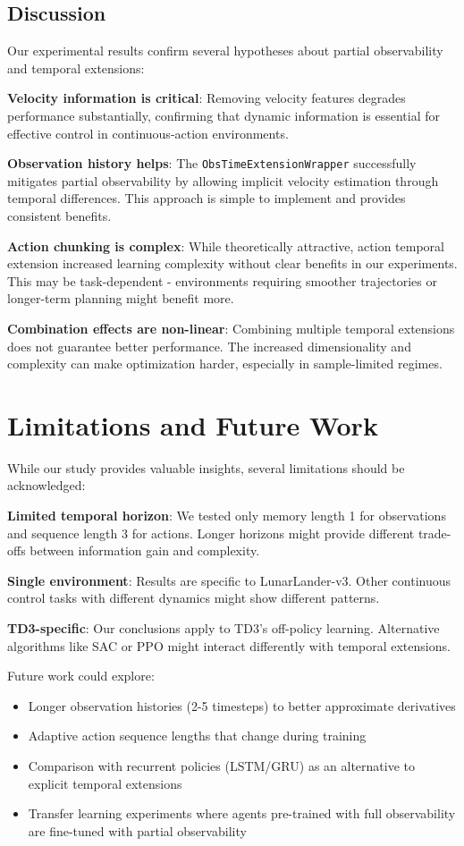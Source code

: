 \documentclass[12pt, a4paper]{article}
\begin{document}
\subsection{Discussion}

Our experimental results confirm several hypotheses about partial observability and temporal extensions:

\textbf{Velocity information is critical}: Removing velocity features degrades performance substantially, confirming that dynamic information is essential for effective control in continuous-action environments.

\textbf{Observation history helps}: The \texttt{ObsTimeExtensionWrapper} successfully mitigates partial observability by allowing implicit velocity estimation through temporal differences. This approach is simple to implement and provides consistent benefits.

\textbf{Action chunking is complex}: While theoretically attractive, action temporal extension increased learning complexity without clear benefits in our experiments. This may be task-dependent - environments requiring smoother trajectories or longer-term planning might benefit more.

\textbf{Combination effects are non-linear}: Combining multiple temporal extensions does not guarantee better performance. The increased dimensionality and complexity can make optimization harder, especially in sample-limited regimes.

\section{Limitations and Future Work}

While our study provides valuable insights, several limitations should be acknowledged:

\textbf{Limited temporal horizon}: We tested only memory length 1 for observations and sequence length 3 for actions. Longer horizons might provide different trade-offs between information gain and complexity.

\textbf{Single environment}: Results are specific to LunarLander-v3. Other continuous control tasks with different dynamics might show different patterns.

\textbf{TD3-specific}: Our conclusions apply to TD3's off-policy learning. Alternative algorithms like SAC or PPO might interact differently with temporal extensions.

Future work could explore:
\begin{itemize}
	\item Longer observation histories (2-5 timesteps) to better approximate derivatives
	\item Adaptive action sequence lengths that change during training
	\item Comparison with recurrent policies (LSTM/GRU) as an alternative to explicit temporal extensions
	\item Transfer learning experiments where agents pre-trained with full observability are fine-tuned with partial observability
\end{itemize}
\end{document}
